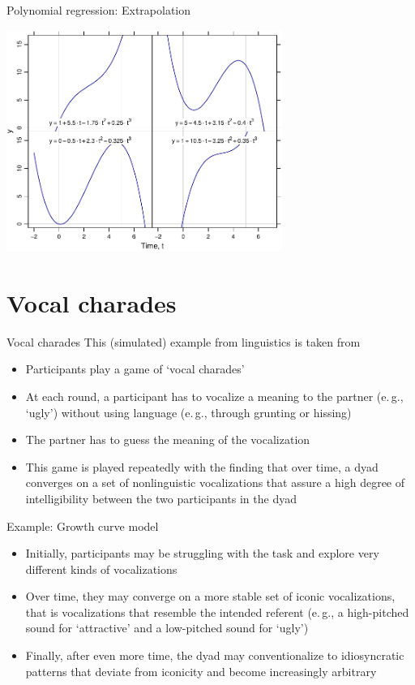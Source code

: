 \documentclass[aspectratio=169]{beamer}
\begin{document}
\begin{frame}{Polynomial regression: Extrapolation}
\begin{center}
\includegraphics[width=9cm]{../figures/cubic-gone-bad}
\end{center}
\end{frame}

\section{Vocal charades}

\begin{frame}{Vocal charades \citep{Winter2016}}
This (simulated) example from linguistics is taken from \citet{Winter2016}\\[2ex]
\begin{itemize}
  \item Participants play a game of `vocal charades'
  \item At each round, a participant has to vocalize a meaning to the
  partner (e.\,g., `ugly') without using language (e.\,g., through grunting or
  hissing)
  \item The partner has to guess the meaning of the vocalization
  \item This game is played repeatedly with the finding that over time, a
  dyad converges on a set of nonlinguistic vocalizations that assure a high
  degree of intelligibility between the two participants in the dyad
\end{itemize}
\end{frame}


\begin{frame}{Example: Growth curve model}
\begin{itemize}
  \item Initially, participants may be struggling with the task and explore
  very different kinds of vocalizations
  \item Over time, they may converge on a more stable set of iconic
  vocalizations, that is vocalizations that resemble the intended referent
  (e.\,g., a high-pitched sound for `attractive' and a low-pitched sound for
  `ugly')
  \item Finally, after even more time, the dyad may conventionalize to
  idiosyncratic patterns that deviate from iconicity and become
  increasingly arbitrary
\end{itemize}
\end{frame}
\end{document}

